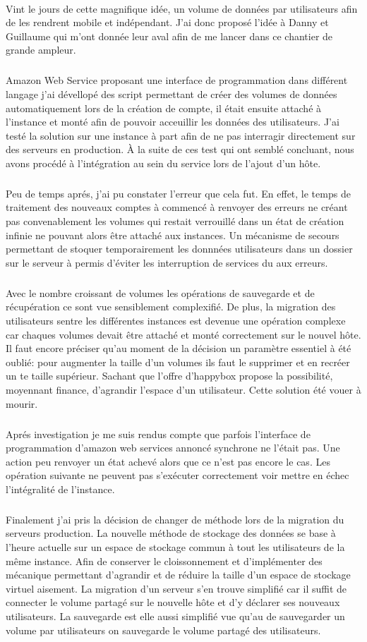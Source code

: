 \documentclass[11pt, a4paper ]{article}
\begin{document}
\begin{spacing}{1.5}
\paragraph{}
Vint le jours de cette magnifique idée, un volume de données par utilisateurs afin de les rendrent mobile et indépendant. J'ai donc proposé l'idée à Danny et Guillaume qui m'ont donnée leur aval afin de me lancer dans ce chantier de grande ampleur. 
\subparagraph{}
Amazon Web Service proposant une interface de programmation dans différent langage j'ai dévellopé des script permettant de créer  des volumes de données automatiquement lors de la création de compte, il était ensuite attaché à l'instance et monté afin de pouvoir acceuillir les données des utilisateurs. 
J'ai testé la solution sur une instance à part afin de ne pas interragir directement sur des serveurs en production. À la suite de ces test qui ont semblé concluant, nous avons procédé à l'intégration au sein du service lors de l'ajout d'un hôte.
\subparagraph{}
Peu de temps aprés, j'ai pu constater l'erreur que cela fut. En effet, le temps de traitement des nouveaux comptes à commencé à renvoyer des erreurs ne créant pas convenablement les volumes qui restait verrouillé dans un état de création infinie ne pouvant alors être attaché aux instances. Un mécanisme de secours permettant de stoquer temporairement les donnnées utilisateurs dans un dossier sur le serveur à permis d'éviter les interruption de services du aux erreurs. 
\subparagraph{}
Avec le nombre croissant de volumes les opérations de sauvegarde et de récupération ce sont vue sensiblement complexifié. De plus, la migration des utilisateurs sentre les différentes instances est devenue une opération complexe car chaques volumes devait être attaché et monté correctement sur le nouvel hôte. Il faut encore préciser qu'au moment de la décision un paramètre essentiel à été oublié: pour augmenter la taille d'un volumes ils faut le supprimer et en recréer un te taille supérieur. Sachant que l'offre d'happybox propose la possibilité, moyennant finance, d'agrandir l'espace d'un utilisateur. Cette solution été vouer à mourir. 
\subparagraph{}
Aprés investigation je me suis rendus compte que parfois l'interface de programmation d'amazon web services annoncé synchrone ne l'était pas. Une action peu renvoyer un état achevé alors que ce n'est pas encore le cas. Les opération suivante ne peuvent pas s'exécuter correctement voir mettre en échec l'intégralité de l'instance.

\subparagraph{}
Finalement j'ai pris la décision de changer de méthode lors de la migration du serveurs production. La nouvelle méthode de stockage des données se base à l'heure actuelle sur un espace de stockage commun à tout les utilisateurs de la même instance. Afin de conserver le cloissonnement et d'implémenter des mécanique permettant d'agrandir et de réduire la taille d'un espace de stockage virtuel aisement. La migration d'un serveur s'en trouve simplifié car il suffit de connecter le volume partagé sur le nouvelle hôte et d'y déclarer ses nouveaux utilisateurs. La sauvegarde est elle aussi simplifié vue qu'au de sauvegarder un volume par utilisateurs on sauvegarde le volume partagé des utilisateurs.



\end{spacing}
\end{document}
